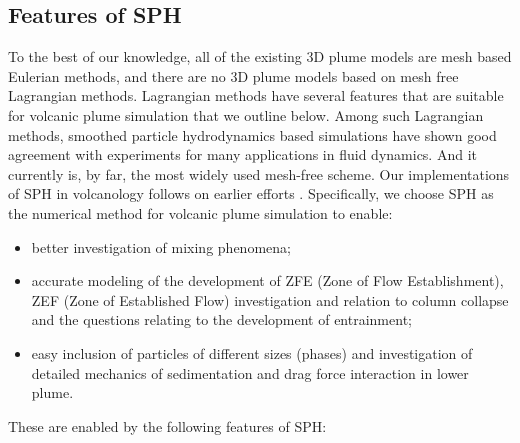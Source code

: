 \documentclass[journal abbreviation, manuscript]{copernicus}
\begin{document}
\subsection{Features of SPH}
To the best of our knowledge, all of the existing 3D plume models are mesh based Eulerian methods, and there are no 3D plume models based on mesh free Lagrangian methods. Lagrangian methods have several features that are suitable for volcanic plume simulation that we outline below. Among such Lagrangian methods, smoothed particle hydrodynamics \citep{gingold1977smoothed,lucy1977numerical} based simulations have shown good agreement with experiments for many applications in fluid dynamics. And it currently is, by far, the most widely used mesh-free scheme. Our implementations of SPH in volcanology follows on earlier efforts   \citep{bursik2003smoothed,herault2010sph,haddad2016smoothed}.
Specifically, we choose SPH as the numerical method for volcanic plume simulation to enable:
\begin{itemize}
\item better investigation of mixing phenomena;
\item accurate modeling of the development of ZFE (Zone of Flow Establishment), ZEF (Zone of Established Flow) investigation and relation to column collapse and the questions relating to the development of entrainment; %
\item  easy inclusion of particles of different sizes (phases) and investigation of detailed mechanics of sedimentation and drag force interaction in lower plume.
\end{itemize}
These are enabled by the following features of SPH:
\end{document}
